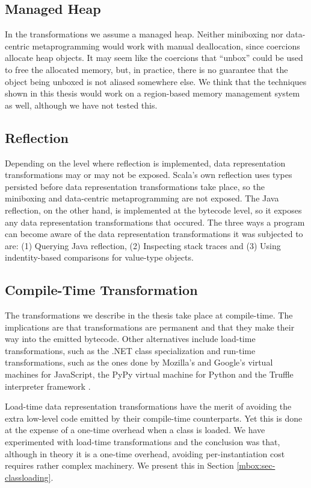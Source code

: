 \subsection{Managed Heap}

In the transformations we assume a managed heap. Neither miniboxing nor data-centric metaprogramming would work with manual deallocation, since coercions allocate heap objects. It may seem like the coercions that ``unbox'' could be used to free the allocated memory, but, in practice, there is no guarantee that the object being unboxed is not aliased somewhere else. We think that the techniques shown in this thesis would work on a region-based \cite{regions} memory management system as well, although we have not tested this.

\subsection{Reflection}

Depending on the level where reflection is implemented, data representation transformations may or may not be exposed. Scala's own reflection uses types persisted before data representation transformations take place, so the miniboxing and data-centric metaprogramming are not exposed. The Java reflection, on the other hand, is implemented at the bytecode level, so it exposes any data representation transformations that occured. The three ways a program can become aware of the data representation transformations it was subjected to are: (1) Querying Java reflection, (2) Inspecting stack traces and (3) Using indentity-based comparisons for value-type objects.

\subsection{Compile-Time Transformation}

The transformations we describe in the thesis take place at compile-time. The implications are that transformations are permanent and that they make their way into the emitted bytecode. Other alternatives include load-time transformations, such as the .NET class specialization \cite{dot-net-generics} and run-time transformations, such as the ones done by Mozilla's \cite{tracemonkey} and Google's virtual machines for JavaScript, the PyPy virtual machine for Python \cite{bolz-pypy-tracing-jit} and the Truffle interpreter framework \cite{truffle}.

Load-time data representation transformations have the merit of avoiding the extra low-level code emitted by their compile-time counterparts. Yet this is done at the expense of a one-time overhead when a class is loaded. We have experimented with load-time transformations and the conclusion was that, although in theory it is a one-time overhead, avoiding per-instantiation cost requires rather complex machinery. We present this in Section \ref{mbox:sec-classloading}.

